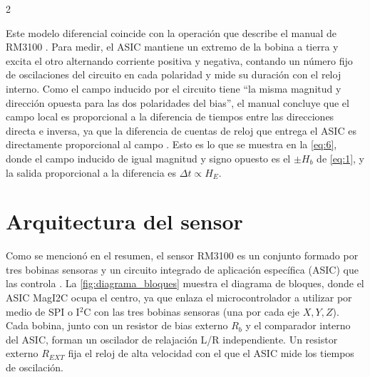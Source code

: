 \documentclass[11pt,letterpaper]{article}
\begin{document}
\begin{multicols*}{2}
\begin{center}
    \label{fig:sensor_operation}
\end{center}

Este modelo diferencial coincide con la operación que describe el manual de RM3100 \citep{pni_manual}. Para medir, el ASIC mantiene un extremo de la bobina a tierra y excita el otro alternando corriente positiva y negativa, contando un número fijo de oscilaciones del circuito en cada polaridad y mide su duración con el reloj interno. Como el campo inducido por el circuito tiene ``la misma magnitud y dirección opuesta para las dos polaridades del bias'', el manual concluye que el campo local es proporcional a la diferencia de tiempos entre las direcciones directa e inversa, ya que la diferencia de cuentas de reloj que entrega el ASIC es directamente proporcional al campo \citep{pni_manual}. Esto es lo que se muestra en la \cref{eq:6}, donde el campo inducido de igual magnitud y signo opuesto es el $\pm H_b$ de \cref{eq:1}, y la salida proporcional a la diferencia es $\Delta t \propto H_E$.


\section{Arquitectura del sensor}
Como se mencionó en el resumen, el sensor RM3100 es un conjunto formado por tres bobinas sensoras y un circuito integrado de aplicación específica (ASIC) que las controla \citep{pni_manual}. La \cref{fig:diagrama_bloques} muestra el diagrama de bloques, donde el ASIC MagI2C ocupa el centro, ya que enlaza el microcontrolador a utilizar por medio de SPI o I$^2$C con las tres bobinas sensoras (una por cada eje $X, Y, Z$). Cada bobina, junto con un resistor de bias externo $R_b$ y el comparador interno del ASIC, forman un oscilador de relajación L/R independiente. Un resistor externo $R_{EXT}$ fija el reloj de alta velocidad con el que el ASIC mide los tiempos de oscilación. 


\end{multicols*}
\end{document}

